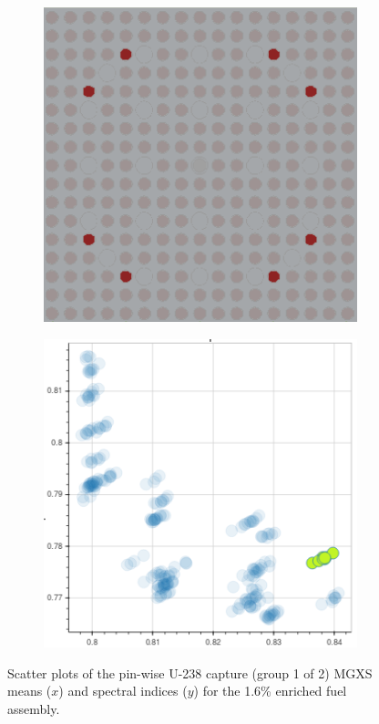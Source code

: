\begin{figure}[h!]
\begin{subfigure}{0.45\textwidth}
  \caption{}
  \label{fig:chap10-capt-mean-spect-ind-mgxs-2}
\end{subfigure}
\begin{subfigure}{0.45\textwidth}
  \centering
  \includegraphics[width=0.9\linewidth]{figures/unsupervised/features/assm-16/u238-capt/mean-spect-ind-sum/geometry-3}
  \caption{}
  \label{fig:chap10-capt-mean-spect-ind-geom-3}
\end{subfigure}%
\begin{subfigure}{0.45\textwidth}
  \centering
  \includegraphics[width=0.9\linewidth]{figures/unsupervised/features/assm-16/u238-capt/mean-spect-ind-sum/mgxs-3}
  \caption{}
  \label{fig:chap10-capt-mean-spect-ind-mgxs-3}
\end{subfigure}
\caption[Clustering of U-238 capture MGXS spectral indices]{Scatter plots of the pin-wise U-238 capture (group 1 of 2) \ac{MGXS} means ($x$) and spectral indices ($y$) for the 1.6\% enriched fuel assembly.}
\label{fig:chap10-capt-mean-spect-ind}
\end{figure}

